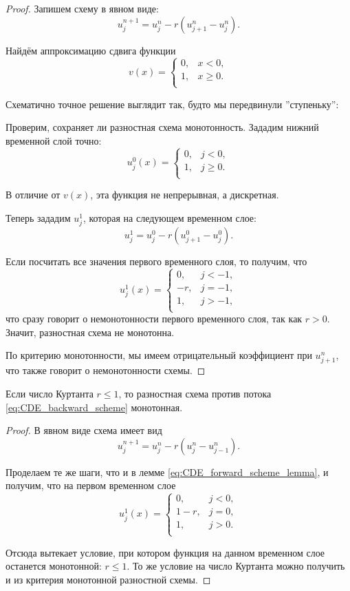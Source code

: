 \documentclass[../main.tex]{subfile}
\begin{document}
\begin{proof}\label{eq:CDE_forward_scheme_lemma}
	Запишем схему в явном виде:
	\[u_j^{n+1}=u_j^n-r(u_{j+1}^n-u_j^n).\]

	Найдём аппроксимацию сдвига функции
	\[v(x)=
		\begin{cases}
			0, & x<0, \\
			1, & x\ge 0. \\
		\end{cases}
	\]

	Схематично точное решение выглядит так, будто мы передвинули
	''ступеньку'':

	

	Проверим, сохраняет ли разностная схема монотонность. Зададим нижний
	временной слой точно:
	\[u_j^0(x)=
		\begin{cases}
			0, & j<0, \\
			1, & j\ge 0. \\
		\end{cases}
	\]

	В отличие от $v(x)$, эта функция не непрерывная, а дискретная.

	Теперь зададим $u_j^1$, которая на следующем временном слое:
	\[u_j^1=u_j^0-r(u_{j+1}^0-u_j^0).\]

	Если посчитать все значения первого временного слоя, то получим, что
	\[u_j^1(x)=
		\begin{cases}
			0, & j<-1, \\
			-r,& j=-1, \\
			1, & j>-1, \\
		\end{cases}
	\]
	что сразу говорит о немонотонности первого временного слоя, так как
	$r>0$. Значит, разностная схема не монотонна.

	По критерию монотонности, мы имеем отрицательный коэффициент при
	$u_{j+1}^n$, что также говорит о немонотонности схемы.
\end{proof}

\begin{theorem}
	Если число Куртанта $r\le 1$, то разностная схема против потока
	\eqref{eq:CDE_backward_scheme} монотонная.
\end{theorem}

\begin{proof}
	В явном виде схема имеет вид
	\[u_j^{n+1}=u_j^n-r(u_j^n-u_{j-1}^n).\]

	Проделаем те же шаги, что и в лемме \eqref{eq:CDE_forward_scheme_lemma},
	и получим, что на первом временном слое
	\[u_j^1(x)=
		\begin{cases}
			0,   & j<0, \\
			1-r, & j=0, \\
			1,   & j>0. \\
		\end{cases}
	\]

	Отсюда вытекает условие, при котором функция на данном временном слое
	останется монотонной: $r\le 1$. То же условие на число Куртанта можно
	получить и из критерия монотонной разностной схемы.
\end{proof}
\end{document}

